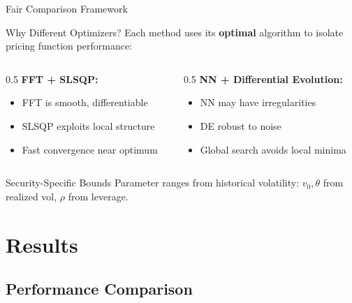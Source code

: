 \documentclass{beamer}
\begin{document}
\begin{frame}{Fair Comparison Framework}
    \begin{block}{Why Different Optimizers?}
        Each method uses its \textbf{optimal} algorithm to isolate pricing function performance:
    \end{block}

    \begin{columns}
        \begin{column}{0.5\textwidth}
            \textbf{FFT + SLSQP:}
            \begin{itemize}
                \item FFT is smooth, differentiable
                \item SLSQP exploits local structure
                \item Fast convergence near optimum
            \end{itemize}
        \end{column}
        \begin{column}{0.5\textwidth}
            \textbf{NN + Differential Evolution:}
            \begin{itemize}
                \item NN may have irregularities
                \item DE robust to noise
                \item Global search avoids local minima
            \end{itemize}
        \end{column}
    \end{columns}

    \vspace{0.2cm}

    \begin{alertblock}{Security-Specific Bounds}
        Parameter ranges from historical volatility: $v_0, \theta$ from realized vol, $\rho$ from leverage.
    \end{alertblock}
\end{frame}

\section{Results}

\subsection{Performance Comparison}
\end{document}
